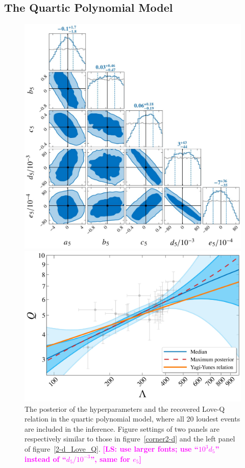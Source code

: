 \documentclass[a4paper,11pt]{article}
\newcommand{\LS}[1]{\textcolor{magenta}{\bf #1}}
\begin{document}
\subsection{The Quartic Polynomial Model}
\label{subsec:results_quartic}

\begin{figure}
\begin{minipage}[t]{0.49\textwidth}
\centering
\includegraphics[width=0.8\linewidth]{fig_Hyper_parameter_5d.pdf}
\end{minipage}
\hfill
\begin{minipage}[t]{0.49\textwidth}
\includegraphics[width=\linewidth]{fig_hierarchical_results_APR4_5d.pdf}
\end{minipage}
    \caption{The posterior of the hyperparameters and the recovered Love-Q
    relation in the quartic polynomial model, where all 20 loudest events are
    included in the inference. Figure settings of two panels are respectively
    similar to those in figure~\ref{corner2-d} and the left panel of
    figure~\ref{2-d_Love_Q}. \LS{[LS: use larger fonts; use ``$10^3 d_5$''
    instead of ``$d_5/10^{-3}$'', same for $e_5$]}
    } \label{5-d_Love_Q} 
\end{figure}
\end{document}
